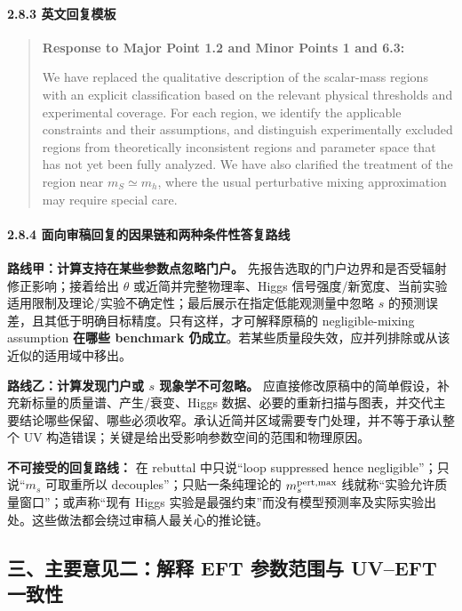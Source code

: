 \documentclass[
]{article}
\begin{document}
\paragraph{2.8.3
英文回复模板}\label{ux82f1ux6587ux56deux590dux6a21ux677f}

\begin{quote}
\textbf{Response to Major Point 1.2 and Minor Points 1 and 6.3:}

We have replaced the qualitative description of the scalar-mass regions
with an explicit classification based on the relevant physical
thresholds and experimental coverage. For each region, we identify the
applicable constraints and their assumptions, and distinguish
experimentally excluded regions from theoretically inconsistent regions
and parameter space that has not yet been fully analyzed. We have also
clarified the treatment of the region near \(m_S \simeq m_h\), where the
usual perturbative mixing approximation may require special care.
\end{quote}

\paragraph{2.8.4
面向审稿回复的因果链和两种条件性答复路线}\label{ux9762ux5411ux5ba1ux7a3fux56deux590dux7684ux56e0ux679cux94feux548cux4e24ux79cdux6761ux4ef6ux6027ux7b54ux590dux8defux7ebf}

\textbf{路线甲：计算支持在某些参数点忽略门户。}
先报告选取的门户边界和是否受辐射修正影响；接着给出 \(\theta\)
或近简并完整物理率、Higgs
信号强度/新宽度、当前实验适用限制及理论/实验不确定性；最后展示在指定低能观测量中忽略
\(s\) 的预测误差，且其低于明确目标精度。只有这样，才可解释原稿的
negligible-mixing assumption \textbf{在哪些 benchmark
仍成立}。若某些质量段失效，应并列排除或从该近似的适用域中移出。

\textbf{路线乙：计算发现门户或 \(s\) 现象学不可忽略。}
应直接修改原稿中的简单假设，补充新标量的质量谱、产生/衰变、Higgs
数据、必要的重新扫描与图表，并交代主要结论哪些保留、哪些必须收窄。承认近简并区域需要专门处理，并不等于承认整个
UV 构造错误；关键是给出受影响参数空间的范围和物理原因。

\textbf{不可接受的回复路线：} 在 rebuttal 中只说``loop suppressed hence
negligible''；只说``\(m_s\) 可取重所以 decouples''；只贴一条纯理论的
\(m_s^{\rm pert,max}\) 线就称``实验允许质量窗口''；或声称``现有 Higgs
实验是最强约束''而没有模型预测率及实际实验出处。这些做法都会绕过审稿人最关心的推论链。

\subsection{三、主要意见二：解释 EFT 参数范围与 UV--EFT
一致性}\label{ux4e09ux4e3bux8981ux610fux89c1ux4e8cux89e3ux91ca-eft-ux53c2ux6570ux8303ux56f4ux4e0e-uveft-ux4e00ux81f4ux6027}
\end{document}
